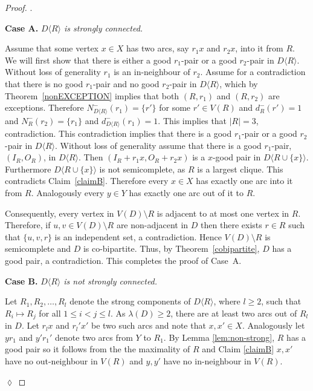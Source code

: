 \documentclass{article}
\theoremstyle{definition}
\newcommand{\induce}[2]{#1\langle #2 \rangle}
\newcommand{\2}{\vspace{0.2cm}}
\newenvironment{subproof}{\par\noindent {\it Proof}.\ }{\hfill$\lozenge$\par\vspace{11pt}}
\begin{document}
\begin{proof}
\begin{subproof}
\2

{\bf Case A.} {\em $\induce{D}{R}$ is strongly connected.}

\2

Assume that some vertex $x \in X$ has two arcs, say $r_1x$ and $r_2x$,
into it from $R$.  We will first show that there is either a good
$r_1$-pair or a good $r_2$-pair in $\induce{D}{R}$.  Without loss of
generality $r_1$ is an in-neighbour of $r_2$.  Assume for a
contradiction that there is no good $r_1$-pair and no good $r_2$-pair
in $\induce{D}{R}$, which by Theorem~\ref{nonEXCEPTION} implies that
both $(R,r_1)$ and $(R,r_2)$ are exceptions.  Therefore
$N_{\induce{D}{R}}^-(r_1) = \{r'\}$ for some $r' \in V(R)$ and
$d_R^-(r') = 1$ and $N_R^-(r_2) = \{r_1\}$ and
$d_{\induce{D}{R}}^-(r_1) = 1$. This implies that $|R|=3$,
contradiction.  This contradiction implies that there is a good
$r_1$-pair or a good $r_2$-pair in $\induce{D}{R}$.  Without loss of
generality assume that there is a good $r_1$-pair, $(I_R,O_R)$, in
$\induce{D}{R}$.  Then $(I_R+r_1x, O_R+r_2x)$ is a $x$-good pair in
$\induce{D}{R \cup \{x\}}$.  Furthermore $\induce{D}{R \cup \{x\}}$ is
not semicomplete, as $R$ is a largest clique. This contradicts
Claim~\ref{claimB}.  Therefore every $x \in X$ has exactly one arc
into it from $R$.  Analogously every $y \in Y$ has exactly one arc
out of it to $R$.

Consequently, every vertex in $V(D) \setminus R$ is adjacent to at
most one vertex in $R$. Therefore, if $u,v \in V(D) \setminus R$ are
non-adjacent in $D$ then there exists $r \in R$ such that $\{u,v,r\}$
is an independent set, a contradiction.  Hence $V(D) \setminus R$ is
semicomplete and $D$ is co-bipartite. Thus, by
Theorem~\ref{cobipartite}, $D$ has a good pair, a contradiction. This
completes the proof of Case~A.

\2

{\bf Case B.} {\em $\induce{D}{R}$ is not strongly connected.}

\2

Let $R_1,R_2,\ldots , R_l$ denote the strong components of
$\induce{D}{R}$, where $l \geq 2$, such that $R_i \mapsto R_j$ for all
$1 \leq i < j \leq l$.  As $\lambda(D) \geq 2$, there are at least two
arcs out of $R_l$ in $D$. Let $r_l x$ and $r_l' x'$ be two such arcs
and note that $x,x' \in X$.  Analogously let $y r_1$ and $y' r_1'$
denote two arcs from $Y$ to $R_1$. 
By Lemma \ref{lem:non-strong}, $R$ has a good pair so it follows from the the maximality of $R$ and Claim \ref{claimB} $x,x'$ have no out-neighbour in $V(R)$ and $y,y'$ have no in-neighbour in $V(R)$.


\end{subproof}
\end{proof}
\end{document}
